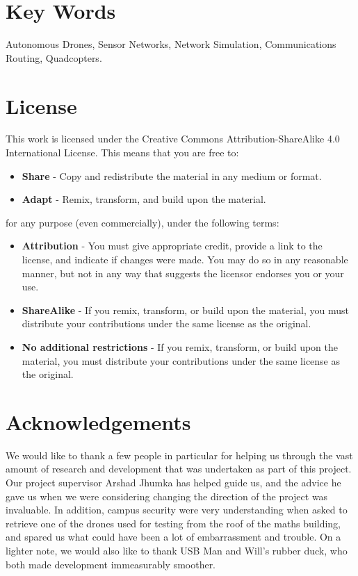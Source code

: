 \section{Key Words}
Autonomous Drones, Sensor Networks, Network Simulation, Communications Routing, Quadcopters.

\section{License}
This work is licensed under the Creative Commons Attribution-ShareAlike 4.0 International License. This means that you are free to:

\begin{itemize}
	\item \textbf{Share} - Copy and redistribute the material in any medium or format.
	\item \textbf{Adapt} - Remix, transform, and build upon the material.
\end{itemize}

for any purpose (even commercially), under the following terms: 

\begin{itemize}
	\item \textbf{Attribution} -  You must give appropriate credit, provide a link to the license, and indicate if changes were made. You may do so in any reasonable manner, but not in any way that suggests the licensor endorses you or your use.
	\item \textbf{ShareAlike} - If you remix, transform, or build upon the material, you must distribute your contributions under the same license as the original.
	\item \textbf{No additional restrictions} - If you remix, transform, or build upon the material, you must distribute your contributions under the same license as the original.
\end{itemize}

\begin{figure}[H]
	\centering
	\doclicenseImage
\end{figure}

\section{Acknowledgements}
We would like to thank a few people in particular for helping us through the vast amount of research and development that was undertaken as part of this project. Our project supervisor Arshad Jhumka has helped guide us, and the advice he gave us when we were considering changing the direction of the project was invaluable. In addition, campus security were very understanding when asked to retrieve one of the drones used for testing from the roof of the maths building, and spared us what could have been a lot of embarrassment and trouble. On a lighter note, we would also like to thank USB Man and Will's rubber duck, who both made development immeasurably smoother.

